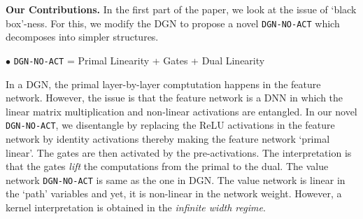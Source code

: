 \textbf{Our Contributions.} In the first part of the paper, we look at the issue of `black box'-ness. For this, we modify the DGN to propose a novel \texttt{DGN-NO-ACT} which decomposes into simpler structures. 

$\bullet$ \texttt{DGN-NO-ACT} = Primal Linearity + Gates + Dual Linearity

In a DGN, the primal layer-by-layer comptutation happens in the feature network. However, the issue is that the feature network is a DNN in which the linear matrix multiplication and non-linear activations are entangled. In our novel \texttt{DGN-NO-ACT}, we disentangle by replacing the ReLU activations in the feature network by identity activations thereby making the feature network `primal linear'. The gates are then activated by the pre-activations. The interpretation is that the gates \emph{lift} the computations from the primal to the dual. The value network \texttt{DGN-NO-ACT} is same as the one in DGN. The value network is linear in the `path' variables and yet, it is non-linear in the network weight. However, a kernel interpretation is obtained in the \emph{infinite width regime}.







